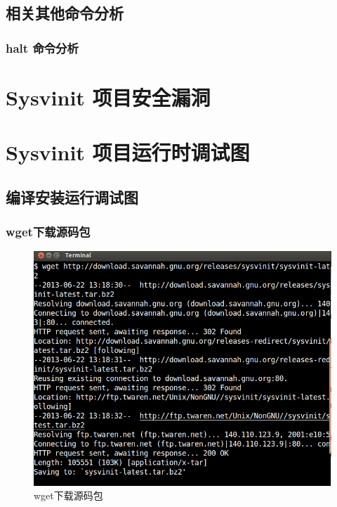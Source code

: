 \section{相关其他命令分析}

\subsection{halt 命令分析}

\chapter{Sysvinit 项目安全漏洞}

\chapter{Sysvinit 项目运行时调试图}

\section{编译安装运行调试图}

\subsection{wget下载源码包}

\begin{figure}[htbp]
\centering
\includegraphics{./pictures/1-1-wget.png}
\caption{wget下载源码包}
\end{figure}

